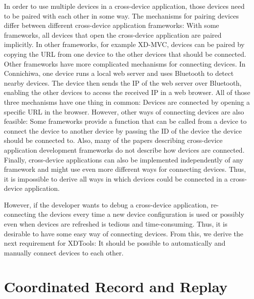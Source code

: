 In order to use multiple devices in a cross-device application, those devices need to be paired with each other in some way. The mechanisms for pairing devices differ between different cross-device application frameworks: With some frameworks, all devices that open the cross-device application are paired implicitly. In other frameworks, for example XD-MVC, devices can be paired by copying the URL from one device to the other devices that should be connected. Other frameworks have more complicated mechanisms for connecting devices. In Connichiwa, one device runs a local web server and uses Bluetooth to detect nearby devices. The device then sends the IP of the web server over Bluetooth, enabling the other devices to access the received IP in a web browser. All of those three mechanisms have one thing in common: Devices are connected by opening a specific URL in the browser. However, other ways of connecting devices are also feasible: Some frameworks provide a function that can be called from a device to connect the device to another device by passing the ID of the device the device should be connected to. Also, many of the papers describing cross-device application development frameworks do not describe how devices are connected. Finally, cross-device applications can also be implemented independently of any framework and might use even more different ways for connecting devices. Thus, it is impossible to derive all ways in which devices could be connected in a cross-device application.

However, if the developer wants to debug a cross-device application, re-connecting the devices every time a new device configuration is used or possibly even when devices are refreshed is tedious and time-consuming. Thus, it is desirable to have some easy way of connecting devices. From this, we derive the next requirement for XDTools: It should be possible to automatically and manually connect devices to each other.

\section{Coordinated Record and Replay}

